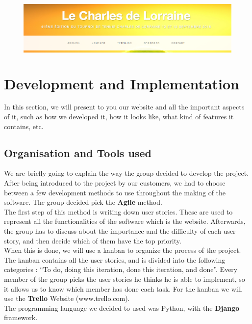 \documentclass[a4paper, 12pt]{article}
\begin{document}
\newpage




\begin{figure}[h]

\includegraphics[scale=0.5]{onglets.png}
\end{figure}
\section{Development and Implementation}
In this section, we will present to you our website and all the important aspects of it, such as how we developed it, how it looks like, what kind of features it contains, etc.

\subsection{Organisation and Tools used}

We are briefly going to explain the way the group decided to develop the project. After being introduced to the project by our customers, we had to choose between a few development methods to use throughout the making of the software. The group decided pick the \textbf{Agile} method. \\

The first step of this method is writing down user stories. These are used to represent all the functionalities of the software which is the website. Afterwards, the group has to discuss about the importance and the difficulty of each user story, and then decide which of them have the top priority. \\

When this is done, we will use a kanban to organize the process of the project. The kanban contains all the user stories, and is divided into the following categories : “To do, doing this iteration, done this iteration, and done”. Every member of the group picks the user stories he thinks he is able to implement, so it allows us to know which member has done each task. For the kanban we will use the \textbf{Trello} Website (www.trello.com). \\

The programming language we decided to used was Python, with the \textbf{Django} framework.\\
\end{document}
